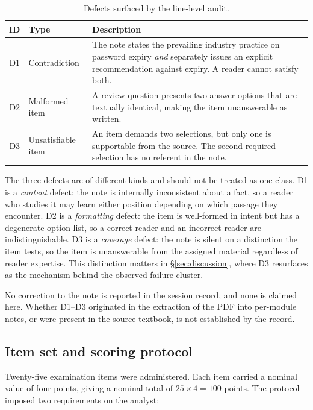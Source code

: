 \documentclass[11pt]{article}
\begin{document}
\begin{table}[htbp]
\centering
\caption{Defects surfaced by the line-level audit.}
\label{tab:defects}
\begin{tabular}{@{}clp{}@{}}
\toprule
ID & Type & Description \\
\midrule
D1 & Contradiction &
The note states the prevailing industry practice on password expiry
\emph{and} separately issues an explicit recommendation against expiry.
A reader cannot satisfy both. \\
D2 & Malformed item &
A review question presents two answer options that are textually
identical, making the item unanswerable as written. \\
D3 & Unsatisfiable item &
An item demands two selections, but only one is supportable from the
source. The second required selection has no referent in the note. \\
\bottomrule
\end{tabular}
\end{table}

The three defects are of different kinds and should not be treated as one
class. D1 is a \emph{content} defect: the note is internally inconsistent
about a fact, so a reader who studies it may learn either position depending
on which passage they encounter. D2 is a \emph{formatting} defect: the item
is well-formed in intent but has a degenerate option list, so a correct
reader and an incorrect reader are indistinguishable. D3 is a
\emph{coverage} defect: the note is silent on a distinction the item tests,
so the item is unanswerable from the assigned material regardless of reader
expertise. This distinction matters in \S\ref{sec:discussion}, where D3
resurfaces as the mechanism behind the observed failure cluster.

No correction to the note is reported in the session record, and none is
claimed here. Whether D1--D3 originated in the extraction of the PDF into
per-module notes, or were present in the source textbook, is not
established by the record.

\subsection{Item set and scoring protocol}
\label{sec:protocol}

Twenty-five examination items were administered. Each item carried a nominal
value of four points, giving a nominal total of
$25 \times 4 = 100$ points. The protocol imposed two requirements on the
analyst:
\end{document}
